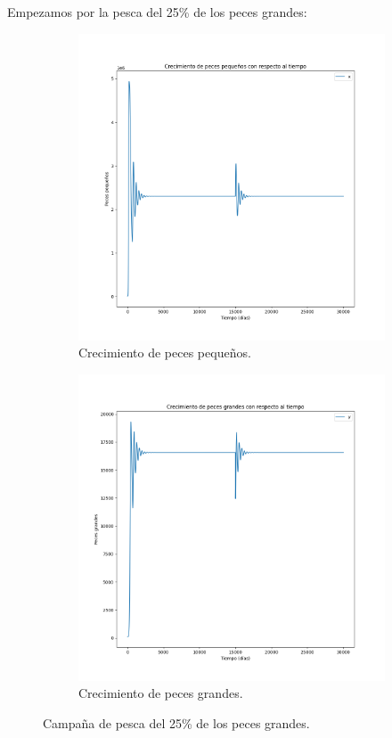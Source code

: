 \documentclass[11pt,a4paper]{report}
\begin{document}
Empezamos por la pesca del 25\% de los peces grandes:
\begin{figure}[H]
  \begin{subfigure}[b]{0.49\textwidth}
    \includegraphics[width=\textwidth, height=\textwidth]{img/Cap-3/apartado-2/pequenyos_pesca_25.png}
    \caption{Crecimiento de peces pequeños.}
    \label{fig:f1}
  \end{subfigure}
  \hfill
  \begin{subfigure}[b]{0.49\textwidth}
    \includegraphics[width=\textwidth, height=\textwidth]{img/Cap-3/apartado-2/grandes_pesca_25.png}
    \caption{Crecimiento de peces grandes.}
    \label{fig:f2}
  \end{subfigure}
  \caption{Campaña de pesca del 25\% de los peces grandes.}
\end{figure}
\end{document}
